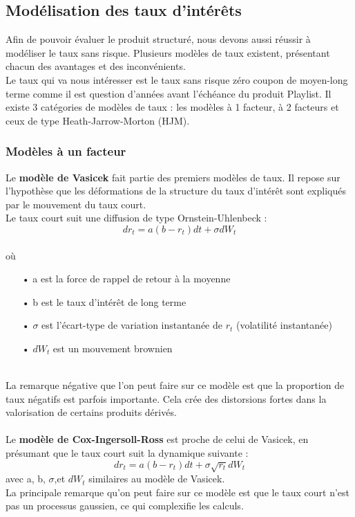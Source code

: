 \documentclass[french,12pt,a4paper]{article}
\begin{document}
\subsection{Modélisation des taux d'intérêts}

Afin de pouvoir évaluer le produit structuré, nous devons aussi réussir à modéliser le taux sans risque. Plusieurs modèles de taux existent, présentant chacun des avantages et des inconvénients.\\
Le taux qui va nous intéresser est le taux sans risque zéro coupon de moyen-long terme comme il est question d'années avant l'échéance du produit Playlist. Il existe 3 catégories de modèles de taux : les modèles à 1 facteur, à 2 facteurs et ceux de type Heath-Jarrow-Morton (HJM).

\subsubsection{Modèles à un facteur}

Le \textbf{modèle de Vasicek} fait partie des premiers modèles de taux. Il repose sur l'hypothèse que les déformations de la structure du taux d'intérêt sont expliqués par le mouvement du taux court.\\
Le taux court suit une diffusion de type Ornstein-Uhlenbeck : \\
$$ dr_{t} = a(b-r_{t})dt + \sigma dW_{t} $$ \\
où
\begin{itemize}
\item[•] a est la force de rappel de retour à la moyenne
\item[•] b est le taux d'intérêt de long terme
\item[•] $\sigma$ est l'écart-type de variation instantanée de $r_{t}$ (volatilité instantanée)
\item[•] $dW_{t}$ est un mouvement brownien
\end{itemize}
\\

La remarque négative que l'on peut faire sur ce modèle est que la proportion de taux négatifs est parfois importante. Cela crée des distorsions fortes dans la valorisation de certains produits dérivés.\\ \\

Le \textbf{modèle de Cox-Ingersoll-Ross} est proche de celui de Vasicek, en présumant que le taux court suit la dynamique suivante :\\
$$ dr_{t} = a(b-r_{t})dt + \sigma \sqrt{r_{t}} dW_{t} $$
avec a, b, $\sigma$,et $dW_{t}$ similaires au modèle de Vasicek.\\
La principale remarque qu'on peut faire sur ce modèle est que le taux court n'est pas un processus gaussien, ce qui complexifie les calculs. \\ \\
\end{document}
